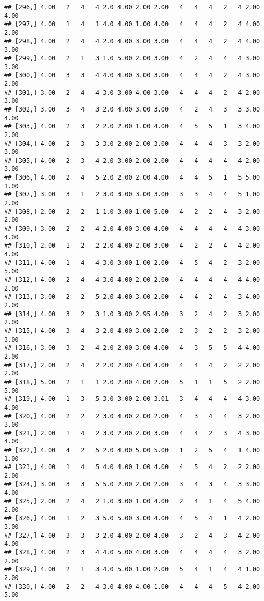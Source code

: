 \documentclass[]{article}
\begin{document}
\begin{verbatim}
## [296,] 4.00   2   4   4 2.0 4.00 2.00 2.00   4   4   4   2   4 2.00 4.00
## [297,] 4.00   1   4   1 4.0 4.00 1.00 4.00   4   4   4   2   4 4.00 2.00
## [298,] 4.00   2   4   4 2.0 4.00 3.00 3.00   4   4   4   2   4 4.00 3.00
## [299,] 4.00   2   1   3 1.0 5.00 2.00 3.00   4   2   4   4   4 3.00 3.00
## [300,] 4.00   3   3   4 4.0 4.00 3.00 3.00   4   4   4   2   4 3.00 2.00
## [301,] 3.00   2   4   4 3.0 3.00 4.00 3.00   4   4   4   2   4 2.00 3.00
## [302,] 3.00   3   4   3 2.0 4.00 3.00 3.00   4   2   4   3   3 3.00 4.00
## [303,] 4.00   2   3   2 2.0 2.00 1.00 4.00   4   5   5   1   3 4.00 2.00
## [304,] 4.00   2   3   3 3.0 2.00 2.00 3.00   4   4   4   3   3 2.00 3.00
## [305,] 4.00   2   3   4 2.0 3.00 2.00 2.00   4   4   4   4   4 2.00 3.00
## [306,] 4.00   2   4   5 2.0 2.00 2.00 4.00   4   4   5   1   5 5.00 1.00
## [307,] 3.00   3   1   2 3.0 3.00 3.00 3.00   3   3   4   4   5 1.00 2.00
## [308,] 2.00   2   2   1 1.0 3.00 1.00 5.00   4   2   2   4   3 2.00 2.00
## [309,] 3.00   2   2   4 2.0 4.00 3.00 4.00   4   4   4   4   4 3.00 4.00
## [310,] 2.00   1   2   2 2.0 4.00 2.00 3.00   4   2   2   4   4 2.00 4.00
## [311,] 4.00   1   4   4 3.0 3.00 1.00 2.00   4   5   4   2   3 2.00 5.00
## [312,] 4.00   2   4   4 3.0 4.00 2.00 2.00   4   4   4   4   4 4.00 2.00
## [313,] 3.00   2   2   5 2.0 4.00 3.00 2.00   4   4   2   4   3 4.00 2.00
## [314,] 4.00   3   2   3 1.0 3.00 2.95 4.00   3   2   4   2   3 2.00 2.00
## [315,] 4.00   3   4   3 2.0 4.00 3.00 2.00   2   3   2   2   3 2.00 3.00
## [316,] 3.00   3   2   4 2.0 2.00 3.00 4.00   4   3   5   5   4 4.00 2.00
## [317,] 2.00   2   4   2 2.0 2.00 4.00 4.00   4   4   4   2   2 2.00 2.00
## [318,] 5.00   2   1   1 2.0 2.00 4.00 2.00   5   1   1   5   2 2.00 5.00
## [319,] 4.00   1   3   5 3.0 3.00 2.00 3.01   3   4   4   4   4 3.00 4.00
## [320,] 4.00   2   2   2 3.0 4.00 2.00 2.00   4   3   4   4   3 2.00 3.00
## [321,] 2.00   1   4   2 3.0 2.00 2.00 3.00   4   4   2   3   4 3.00 4.00
## [322,] 4.00   4   2   5 2.0 4.00 5.00 5.00   1   2   5   4   1 4.00 1.00
## [323,] 4.00   1   4   5 4.0 4.00 1.00 4.00   4   5   4   2   2 2.00 2.00
## [324,] 3.00   3   3   5 5.0 2.00 2.00 2.00   3   4   3   4   3 3.00 4.00
## [325,] 2.00   2   4   2 1.0 3.00 1.00 4.00   2   4   1   4   5 4.00 2.00
## [326,] 4.00   1   2   3 5.0 5.00 3.00 4.00   4   5   4   1   4 2.00 3.00
## [327,] 4.00   3   3   3 2.0 4.00 2.00 4.00   3   2   4   3   4 2.00 4.00
## [328,] 4.00   2   3   4 4.0 5.00 4.00 3.00   4   4   4   4   3 2.00 2.00
## [329,] 4.00   2   1   3 4.0 5.00 1.00 2.00   5   4   1   4   4 1.00 2.00
## [330,] 4.00   2   2   4 3.0 4.00 4.00 1.00   4   4   4   5   4 2.00 5.00

\end{verbatim}
\end{document}
